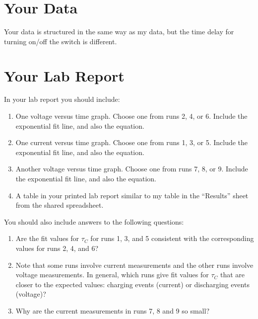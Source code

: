 \section{Your Data}
Your data is structured in the same way as my data, but the time delay for turning on/off the switch is different.
\section{Your Lab Report}
In your lab report you should include:
\begin{enumerate}
	\item One voltage versus time graph. Choose one from runs 2, 4, or 6. Include the exponential fit line, and also the equation.
	\item One current versus time graph. Choose one from runs 1, 3, or 5. Include the exponential fit line, and also the equation.
	\item Another voltage versus time graph. Choose one from runs 7, 8, or 9. Include the exponential fit line, and also the equation.
	\item A table in your printed lab report similar to my table in the ``Results'' sheet from the shared spreadsheet.
\end{enumerate}
You should also include answers to the following questions:
\begin{enumerate}
	\item Are the fit values for $\tau_{C}$ for runs 1, 3, and 5 consistent with the corresponding values for runs 2, 4, and 6?
	\item Note that some runs involve current measurements and the other runs involve voltage measurements. In general, which runs give fit values for $\tau_{C}$ that are closer to the expected values: charging events (current) or discharging events (voltage)?
	\item Why are the current measurements in runs 7, 8 and 9 so small?
\end{enumerate}